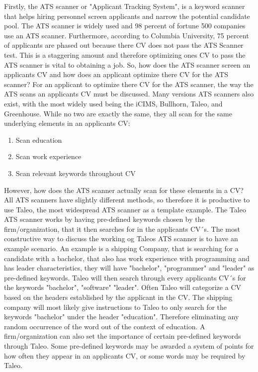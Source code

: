 Firstly, the ATS scanner or "Applicant Tracking System", is a keyword scanner that helps hiring personnel screen applicants and narrow the potential candidate pool.
The ATS scanner is widely used and 98 percent of fortune 500 companies use an ATS scanner.
Furthermore, according to Columbia University, 75 percent of applicants are phased out because there CV does not pass the ATS Scanner test.
This is a staggering amount and therefore optimizing ones CV to pass the ATS scanner is vital to obtaining a job.
So, how does the ATS scanner screen an applicants CV and how does an applicant optimize there CV for the ATS scanner?
For an applicant to optimize there CV for the ATS scanner, the way the ATS scans an applicants CV must be discussed.
Many versions ATS scanners also exist, with the most widely used being the iCIMS, Bullhorn, Taleo, and Greenhouse.
While no two are exactly the same, they all scan for the same underlying elements in an applicants CV:
\begin{enumerate}
   \item Scan education
   \item Scan work experience
   \item Scan relevant keywords throughout CV
\end{enumerate}
However, how does the ATS scanner actually scan for these elements in a CV?
All ATS scanners have slightly different methods, so therefore it is productive to use Taleo, the most widespread ATS scanner as a template example.
The Taleo ATS scanner works by having pre-defined keywords chosen by the firm/organization, that it then searches for in the applicants CV´s.
The most constructive way to discuss the working og Taleos ATS scanner is to have an example scenario.
An example is a shipping Company, that is searching for a candidate with a bachelor, that also has work experience with programming and has leader characteristics, they will have "bachelor", "programmer" and "leader" as pre-defined keywords.
Taleo will then search through every applicants CV´s for the keywords "bachelor", "software" "leader".
Often Taleo will categorize a CV based on the headers established by the applicant in the CV.
The shipping company will most likely give instructions to Taleo to only search for the keywords "bachelor" under the header "education".
Therefore eliminating any random occurrence of the word out of the context of education.
A firm/organization can also set the importance of certain pre-defined keywords through Taleo.
Some pre-defined keywords may be awarded a system of points for how often they appear in an applicants CV, or some words may be required by Taleo.

